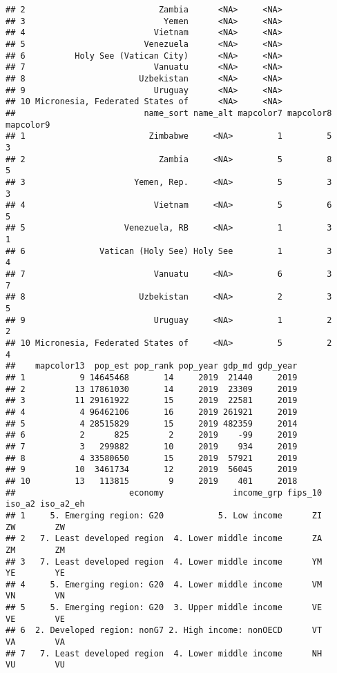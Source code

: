 \documentclass[
]{article}
\begin{document}
\begin{verbatim}
## 2                           Zambia      <NA>     <NA>
## 3                            Yemen      <NA>     <NA>
## 4                          Vietnam      <NA>     <NA>
## 5                        Venezuela      <NA>     <NA>
## 6          Holy See (Vatican City)      <NA>     <NA>
## 7                          Vanuatu      <NA>     <NA>
## 8                       Uzbekistan      <NA>     <NA>
## 9                          Uruguay      <NA>     <NA>
## 10 Micronesia, Federated States of      <NA>     <NA>
##                          name_sort name_alt mapcolor7 mapcolor8 mapcolor9
## 1                         Zimbabwe     <NA>         1         5         3
## 2                           Zambia     <NA>         5         8         5
## 3                      Yemen, Rep.     <NA>         5         3         3
## 4                          Vietnam     <NA>         5         6         5
## 5                    Venezuela, RB     <NA>         1         3         1
## 6               Vatican (Holy See) Holy See         1         3         4
## 7                          Vanuatu     <NA>         6         3         7
## 8                       Uzbekistan     <NA>         2         3         5
## 9                          Uruguay     <NA>         1         2         2
## 10 Micronesia, Federated States of     <NA>         5         2         4
##    mapcolor13  pop_est pop_rank pop_year gdp_md gdp_year
## 1           9 14645468       14     2019  21440     2019
## 2          13 17861030       14     2019  23309     2019
## 3          11 29161922       15     2019  22581     2019
## 4           4 96462106       16     2019 261921     2019
## 5           4 28515829       15     2019 482359     2014
## 6           2      825        2     2019    -99     2019
## 7           3   299882       10     2019    934     2019
## 8           4 33580650       15     2019  57921     2019
## 9          10  3461734       12     2019  56045     2019
## 10         13   113815        9     2019    401     2018
##                       economy              income_grp fips_10 iso_a2 iso_a2_eh
## 1     5. Emerging region: G20           5. Low income      ZI     ZW        ZW
## 2   7. Least developed region  4. Lower middle income      ZA     ZM        ZM
## 3   7. Least developed region  4. Lower middle income      YM     YE        YE
## 4     5. Emerging region: G20  4. Lower middle income      VM     VN        VN
## 5     5. Emerging region: G20  3. Upper middle income      VE     VE        VE
## 6  2. Developed region: nonG7 2. High income: nonOECD      VT     VA        VA
## 7   7. Least developed region  4. Lower middle income      NH     VU        VU

\end{verbatim}
\end{document}
